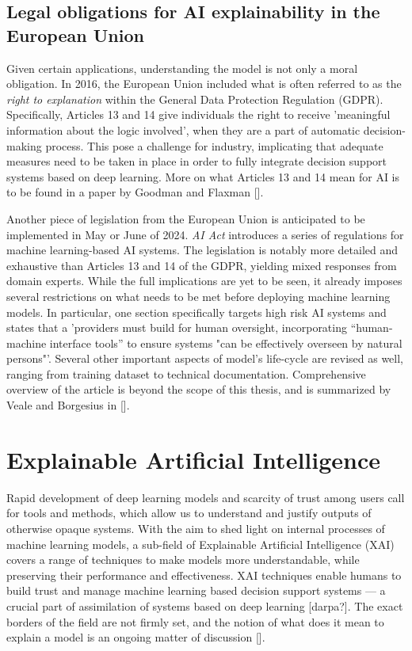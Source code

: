 \subsection*{Legal obligations for AI explainability in the European Union}

Given certain applications, understanding the model is not only a moral obligation. In 2016, the European Union included what is often referred to as the \emph{right to explanation} within the General Data Protection Regulation (GDPR). Specifically, Articles 13 and 14 give individuals the right to receive 'meaningful information about the logic involved', when they are a part of automatic decision-making process.  This pose a challenge for industry, implicating that adequate measures need to be taken in place in order to fully integrate decision support systems based on deep learning. More on what Articles 13 and 14 mean for AI is to be found in a paper by Goodman and Flaxman [].


Another piece of legislation from the European Union is anticipated to be implemented in May or June of 2024. \emph{AI Act} introduces a series of regulations for machine learning-based AI systems. The legislation is notably more detailed and exhaustive than Articles 13 and 14 of the GDPR, yielding mixed responses from domain experts. While the full implications are yet to be seen, it already imposes several restrictions on what needs to be met before deploying machine learning models. In particular, one section specifically targets high risk AI systems and states that a 'providers must build for human oversight, incorporating ``human-machine interface tools'' to ensure systems "can be effectively overseen by natural persons"'. Several other important aspects of model's life-cycle are revised as well, ranging from training dataset to technical documentation. Comprehensive overview of the article is beyond the scope of this thesis, and is summarized by Veale and Borgesius in [].


\section{Explainable Artificial Intelligence}

Rapid development of deep learning models and scarcity of trust among users call for tools and methods, which allow us to understand and justify outputs of otherwise opaque systems. With the aim to shed light on internal processes of machine learning models, a sub-field of Explainable Artificial Intelligence (XAI) covers a range of techniques to make models more understandable, while preserving their performance and effectiveness. XAI techniques enable humans to build trust and manage machine learning based decision support systems --- a crucial part of assimilation of systems based on deep learning [darpa?]. The exact borders of the field are not firmly set, and the notion of what does it mean to explain a model is an ongoing matter of discussion [].

